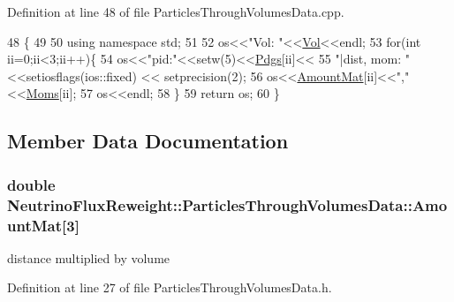 Definition at line 48 of file Particles\-Through\-Volumes\-Data.\-cpp.


\begin{DoxyCode}
48                                                                      \{
49  
50     \textcolor{keyword}{using namespace }std;
51     
52     os<<\textcolor{stringliteral}{"Vol: "}<<\hyperlink{class_neutrino_flux_reweight_1_1_particles_through_volumes_data_a7981341eb993e13d4512cf438c1c2e52}{Vol}<<endl;
53     \textcolor{keywordflow}{for}(\textcolor{keywordtype}{int} ii=0;ii<3;ii++)\{
54       os<<\textcolor{stringliteral}{"pid:"}<<setw(5)<<\hyperlink{class_neutrino_flux_reweight_1_1_particles_through_volumes_data_aa4f638f9eebba5ba2d59f909c077fa19}{Pdgs}[ii]<<
55         \textcolor{stringliteral}{"|dist, mom: "}<<setiosflags(ios::fixed) << setprecision(2);
56       os<<\hyperlink{class_neutrino_flux_reweight_1_1_particles_through_volumes_data_a897eba4f8766a1c110c4e473150f6c6e}{AmountMat}[ii]<<\textcolor{stringliteral}{","}<<\hyperlink{class_neutrino_flux_reweight_1_1_particles_through_volumes_data_a373e722f967c878fa1749ae224a721fc}{Moms}[ii];
57       os<<endl;
58     \}
59     \textcolor{keywordflow}{return} os;
60   \}
\end{DoxyCode}


\subsection{Member Data Documentation}
\hypertarget{class_neutrino_flux_reweight_1_1_particles_through_volumes_data_a897eba4f8766a1c110c4e473150f6c6e}{
\subsubsection[{Amount\-Mat}]{\setlength{\rightskip}{0pt plus 5cm}double Neutrino\-Flux\-Reweight\-::\-Particles\-Through\-Volumes\-Data\-::\-Amount\-Mat\mbox{[}3\mbox{]}}}\label{class_neutrino_flux_reweight_1_1_particles_through_volumes_data_a897eba4f8766a1c110c4e473150f6c6e}


distance multiplied by volume 



Definition at line 27 of file Particles\-Through\-Volumes\-Data.\-h.

